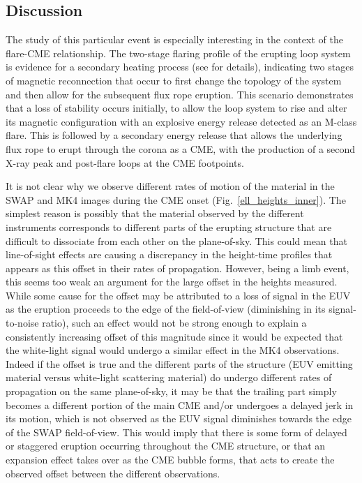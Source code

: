 \documentclass[namedreferences]{solarphysics}
\begin{document}
\begin{article}
\section{Discussion}
\label{sect:discussion}

The study of this particular event is especially interesting in the context of the flare-CME relationship. The two-stage flaring profile of the erupting loop system is evidence for a secondary heating process (see \cite{2012ApJ...746L...5S} for details), indicating two stages of magnetic reconnection that occur to first change the topology of the system and then allow for the subsequent flux rope eruption. This scenario demonstrates that a loss of stability occurs initially, to allow the loop system to rise and alter its magnetic configuration with an explosive energy release detected as an M-class flare. This is followed by a secondary energy release that allows the underlying flux rope to erupt through the corona as a CME, with the production of a second X-ray peak and post-flare loops at the CME footpoints.

It is not clear why we observe different rates of motion of the material in the SWAP and MK4 images during the CME onset (Fig.~\ref{ell_heights_inner}). The simplest reason is possibly that the material observed by the different instruments corresponds to different parts of the erupting structure that are difficult to dissociate from each other on the plane-of-sky. This could mean that line-of-sight effects are causing a discrepancy in the height-time profiles that appears as this offset in their rates of propagation. However, being a limb event, this seems too weak an argument for the large offset in the heights measured. While some cause for the offset may be attributed to a loss of signal in the EUV as the eruption proceeds to the edge of the field-of-view (diminishing in its signal-to-noise ratio), such an effect would not be strong enough to explain a consistently increasing offset of this magnitude since it would be expected that the white-light signal would undergo a similar effect in the MK4 observations. Indeed if the offset is true and the different parts of the structure (EUV emitting material versus white-light scattering material) do undergo different rates of propagation on the same plane-of-sky, it may be that the trailing part simply becomes a different portion of the main CME and/or undergoes a delayed jerk in its motion, which is not observed as the EUV signal diminishes towards the edge of the SWAP field-of-view. This would imply that there is some form of delayed or staggered eruption occurring throughout the CME structure, or that an expansion effect takes over as the CME bubble forms, that acts to create the observed offset between the different observations. 


\end{article}
\end{document}
